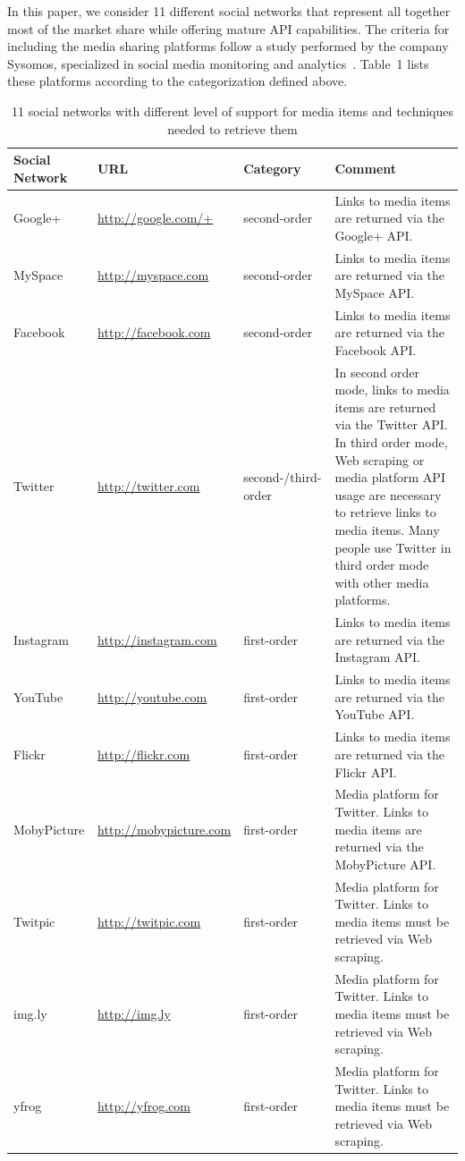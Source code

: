 In this paper, we consider 11 different social networks that represent all together most of the market share while offering mature API capabilities.
The criteria for including the media sharing platforms follow a study performed by the company Sysomos, specialized in social media monitoring and analytics~\cite{Sysomos2011}. Table~1 lists these platforms according to the categorization defined above.
\begin{table}[htbp]
  {\small
  \begin{tabular}{|l|l|l|p{8cm}|}
    \hline
    \textbf{Social Network} & \textbf{URL} & \textbf{Category} & \textbf{Comment}\\
    \hline
	Google+ & \url{http://google.com/+} & second-order & Links to media items are returned via the Google+ API.\\
	MySpace & \url{http://myspace.com} & second-order & Links to media items are returned via the MySpace API.\\
	Facebook & \url{http://facebook.com} & second-order & Links to media items are returned via the Facebook API.\\
	Twitter & \url{http://twitter.com} & second-/third-order & In second order mode, links to media items are returned via the Twitter API. In third order mode, Web scraping or media platform API usage are necessary to retrieve links to media items. Many people use Twitter in third order mode with other media platforms.\\\hline
	Instagram & \url{http://instagram.com} & first-order & Links to media items are returned via the Instagram API.\\
	YouTube & \url{http://youtube.com} & first-order & Links to media items are returned via the YouTube API.\\
	Flickr & \url{http://flickr.com} & first-order & Links to media items are returned via the Flickr API.\\
	MobyPicture & \url{http://mobypicture.com} & first-order & Media platform for Twitter. Links to media items are returned via the MobyPicture API.\\
	Twitpic & \url{http://twitpic.com} & first-order & Media platform for Twitter. Links to media items must be retrieved via Web scraping.\\
	img.ly & \url{http://img.ly} & first-order & Media platform for Twitter. Links to media items must be retrieved via Web scraping.\\
	yfrog & \url{http://yfrog.com} & first-order & Media platform for Twitter. Links to media items must be retrieved via Web scraping.\\
	\hline
  \end{tabular}
  }
  \caption{11 social networks with different level of support for media items and techniques needed to retrieve them}
  \label{tab:platforms}
\end{table}

